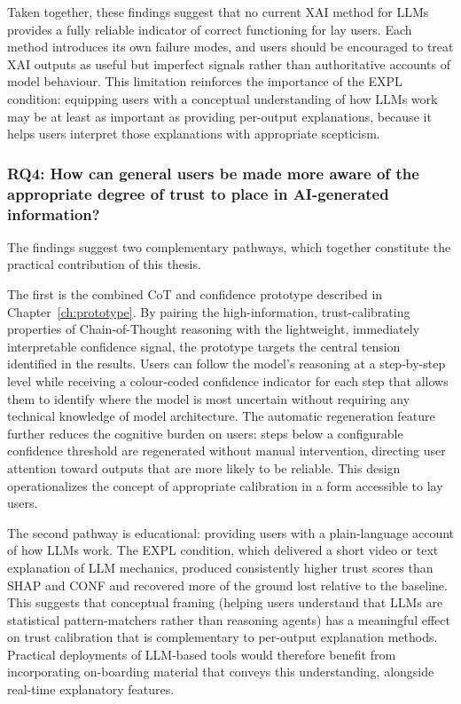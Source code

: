 Taken together, these findings suggest that no current XAI method for LLMs provides a fully reliable indicator of correct functioning for lay users. Each method introduces its own failure modes, and users should be encouraged to treat XAI outputs as useful but imperfect signals rather than authoritative accounts of model behaviour. This limitation reinforces the importance of the EXPL condition: equipping users with a conceptual understanding of how LLMs work may be at least as important as providing per-output explanations, because it helps users interpret those explanations with appropriate scepticism.

\subsubsection*{RQ4: How can general users be made more aware of the appropriate degree of trust to place in AI-generated information?}

The findings suggest two complementary pathways, which together constitute the practical contribution of this thesis.

The first is the combined CoT and confidence prototype described in Chapter~\ref{ch:prototype}. By pairing the high-information, trust-calibrating properties of Chain-of-Thought reasoning with the lightweight, immediately interpretable confidence signal, the prototype targets the central tension identified in the results. Users can follow the model's reasoning at a step-by-step level while receiving a colour-coded confidence indicator for each step that allows them to identify where the model is most uncertain without requiring any technical knowledge of model architecture. The automatic regeneration feature further reduces the cognitive burden on users: steps below a configurable confidence threshold are regenerated without manual intervention, directing user attention toward outputs that are more likely to be reliable. This design operationalizes the concept of appropriate calibration in a form accessible to lay users.

The second pathway is educational: providing users with a plain-language account of how LLMs work. The EXPL condition, which delivered a short video or text explanation of LLM mechanics, produced consistently higher trust scores than SHAP and CONF and recovered more of the ground lost relative to the baseline. This suggests that conceptual framing (helping users understand that LLMs are statistical pattern-matchers rather than reasoning agents) has a meaningful effect on trust calibration that is complementary to per-output explanation methods. Practical deployments of LLM-based tools would therefore benefit from incorporating on-boarding material that conveys this understanding, alongside real-time explanatory features.

